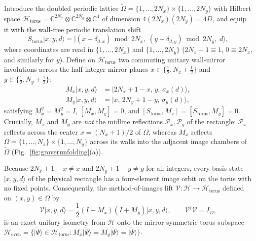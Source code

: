 \documentclass[11pt,a4paper,oneside]{report}
\newcommand{\ket}[1]{\lvert #1\rangle}
\newcommand{\HH}{\mathcal H}
\newcommand{\Id}{I}
\numberwithin{equation}{chapter}
\begin{document}
Introduce the doubled periodic lattice
\(\widetilde\Omega=\{1,\ldots,2N_x\}\times\{1,\ldots,2N_y\}\) with Hilbert
space \(\HH_{\mathrm{torus}}=\mathbb C^{2N_x}\otimes\mathbb C^{2N_y}\otimes\mathbb C^4\)
of dimension \(4(2N_x)(2N_y)=4D\), and equip it with the wall-free periodic
translation shift
\begin{equation}
S_{\mathrm{torus}}\ket{x,y,d}
=\ket{(x+\delta_{d,x})\bmod 2N_x,\;(y+\delta_{d,y})\bmod 2N_y,\;d},
\end{equation}
where coordinates are read in \(\{1,\ldots,2N_x\}\) and
\(\{1,\ldots,2N_y\}\) (\(2N_x+1\equiv1\), \(0\equiv2N_x\), and similarly
for \(y\)). Define on \(\HH_{\mathrm{torus}}\) two commuting unitary
wall-mirror involutions across the half-integer mirror planes
\(x\in\{\tfrac12,N_x+\tfrac12\}\) and \(y\in\{\tfrac12,N_y+\tfrac12\}\):
\begin{align}
M_x\ket{x,y,d}&=\ket{2N_x+1-x,\,y,\,\sigma_x(d)},\\
M_y\ket{x,y,d}&=\ket{x,\,2N_y+1-y,\,\sigma_y(d)},
\end{align}
satisfying \(M_x^2=M_y^2=\Id\), \([M_x,M_y]=0\), and
\([S_{\mathrm{torus}},M_x]=[S_{\mathrm{torus}},M_y]=0\). Crucially,
\(M_x\) and \(M_y\) are \emph{not} the midline reflections
\(\mathcal P_x,\mathcal P_y\) of the rectangle: \(\mathcal P_x\) reflects
across the center \(x=(N_x+1)/2\) of \(\Omega\), whereas \(M_x\) reflects
\(\Omega=\{1,\ldots,N_x\}\times\{1,\ldots,N_y\}\) across its walls into the
adjacent image chambers of \(\widetilde\Omega\)
(Fig.~\ref{fig:groverunfolding}(a)).

Because \(2N_x+1-x\neq x\) and \(2N_y+1-y\neq y\) for all integers, every
basis state \(\ket{x,y,d}\) of the physical rectangle has a four-element
image orbit on the torus with no fixed points. Consequently, the
method-of-images lift \(\mathcal V:\HH\to\HH_{\mathrm{torus}}\) defined on
\((x,y)\in\Omega\) by
\begin{equation}
\boxed{
\mathcal V\ket{x,y,d}
=\frac12(\Id+M_x)(\Id+M_y)\ket{x,y,d},
\qquad \mathcal V^\dagger\mathcal V=\Id_D,
}
\label{eq:isometryV}
\end{equation}
is an exact unitary isometry from \(\HH\) onto the mirror-symmetric torus
subspace \(\HH_{\mathrm{even}}=\{\ket{\widetilde\Psi}\in\HH_{\mathrm{torus}}:
M_x\ket{\widetilde\Psi}=M_y\ket{\widetilde\Psi}=\ket{\widetilde\Psi}\}\).
\end{document}
